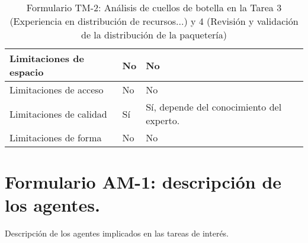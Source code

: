 \begin{table}[H]
{\begin{tabular}{|l|l|l|}
		Limitaciones de espacio& \multicolumn{1}{p{1.0cm}|}{No} & \multicolumn{1}{p{13.0cm}|}{No}\\
		\hline

		Limitaciones de acceso& \multicolumn{1}{p{1.0cm}|}{No} & \multicolumn{1}{p{13.0cm}|}{No}\\
		\hline

		Limitaciones de calidad& \multicolumn{1}{p{1.0cm}|}{Sí} & \multicolumn{1}{p{13.0cm}|}{Sí, depende del conocimiento del experto.}\\
		\hline

		Limitaciones de forma& \multicolumn{1}{p{1.0cm}|}{No} & \multicolumn{1}{p{13.0cm}|}{No}\\
		\hline

	  \end{tabular}
	}
	\caption{\label{tab:TM22}Formulario TM-2: Análisis de cuellos de botella en la Tarea 3 (Experiencia en distribución de recursos...) y 4 (Revisión y validación de la distribución de la paquetería)}
  \end{table}

\newpage


\section{Formulario AM-1: descripción de los agentes.}
Descripción de los agentes implicados en las tareas de interés.

